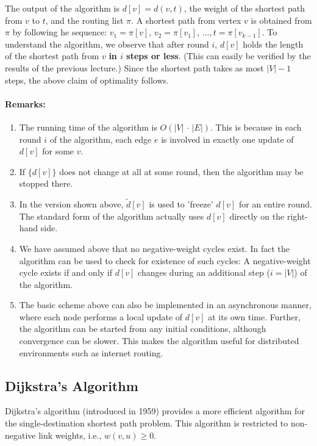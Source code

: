 The output of the algorithm is $d[v] = d(v,t)$, the weight of the shortest path from $v$ to $t$, and the routing list $\pi $. A shortest path from vertex $v$ is obtained from $\pi $ by following he sequence: ${v_1} = \pi [v]$, ${v_2} = \pi [{v_1}]$, $ \ldots ,$$t = \pi [{v_{k - 1}}]$.
To understand the algorithm, we observe that after round $i$, $d[v]$ holds the length of the shortest path from $v$ \textbf{in $i$ steps or less}. (This can easily be verified by the results of the previous lecture.) Since the shortest path takes as most $|V| - 1$ steps, the above claim of optimality follows.

\paragraph{Remarks:}
\begin{enumerate}
  \item The running time of the algorithm is $O(|V|\, \cdot \,|E|)$. This is because in each round $i$ of the algorithm, each edge $e$ is involved in exactly one update of $d[v]$ for some $v$.
  \item If $\{ d[v]\}$ does not change at all at some round, then the algorithm may be stopped there.
  \item In the version shown above, $\tilde d[v]$ is used to 'freeze' $d[v]$ for an entire round. The standard form of the algorithm actually uses $d[v]$ directly on the right-hand side.
  \item We have assumed above that no negative-weight cycles exist. In fact the algorithm can be used to check for existence of such cycles: A negative-weight cycle exists if and only if  $d[v]$ changes during an additional step ($i = |V|$) of the algorithm.
  \item The basic scheme above can also be implemented in an asynchronous manner, where each node performs a local update of $d[v]$ at its own time. Further, the algorithm can be started from any initial conditions, although convergence can be slower. This makes the algorithm useful for distributed environments such as internet routing.
\end{enumerate}

\subsection{Dijkstra's Algorithm}
Dijkstra's algorithm (introduced in 1959) provides a more efficient algorithm for the single-destination shortest path problem. This algorithm is restricted to non-negative link weights, i.e., $w(v,u) \ge 0$.


